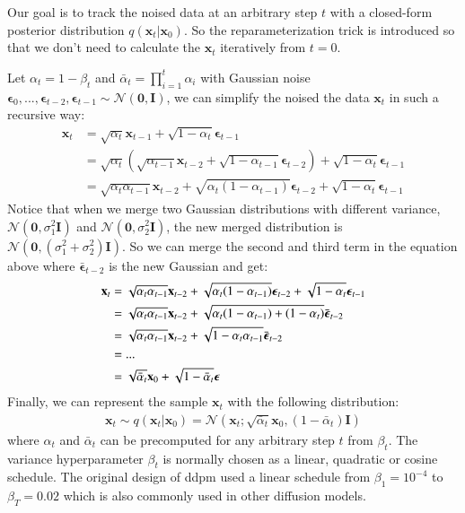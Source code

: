\documentclass[12pt,DIV14,BCOR12mm,a4paper,footinclude=false,headinclude,parskip=half-,twoside,openright,cleardoublepage=empty,toc=index,bibliography=totoc,listof=totoc]{scrreprt}
\numberwithin{equation}{chapter}
\begin{document}
Our goal is to track the noised data at an arbitrary step $t$ with a closed-form posterior distribution $q(\mathbf{x}_{t}|\mathbf{x}_{0})$. So the reparameterization trick is introduced so that we don't need to calculate the $\mathbf{x}_{t}$ iteratively from $t=0$.

Let $\alpha_{t} = 1 - \beta_{t}$ and $\bar{\alpha}_{t} = \prod_{i=1}^{t}\alpha_{i}$ with Gaussian noise $\boldsymbol{\epsilon}_{0},...,\boldsymbol{\epsilon}_{t-2},\boldsymbol{\epsilon}_{t-1} \sim \mathcal{N}(\mathbf{0}, \mathbf{I})$, we can simplify the noised the data $\mathbf{x}_{t}$ in such a recursive way:
\begin{align*}
  \mathbf{x}_{t} &= \sqrt{\alpha_{t}}\mathbf{x}_{t-1} + \sqrt{1-\alpha_{t}}\boldsymbol{\epsilon}_{t-1}\\
                 &= \sqrt{\alpha_{t}}(\sqrt{\alpha_{t-1}}\mathbf{x}_{t-2} + \sqrt{1-\alpha_{t-1}}\boldsymbol{\epsilon}_{t-2}) + \sqrt{1-\alpha_{t}}\boldsymbol{\epsilon}_{t-1}\\
                 &= \sqrt{\alpha_{t}\alpha_{t-1}}\mathbf{x}_{t-2} + \sqrt{\alpha_{t}(1-\alpha_{t-1})}\boldsymbol{\epsilon}_{t-2} + \sqrt{1-\alpha_{t}}\boldsymbol{\epsilon}_{t-1}
\end{align*}
Notice that when we merge two Gaussian distributions with different variance, $\mathcal{N} (\mathbf{0}, \sigma^{2}_{1}\mathbf{I})$ and $\mathcal{N} (\mathbf{0}, \sigma^{2}_{2}\mathbf{I})$, the new merged distribution is $\mathcal{N} (\mathbf{0}, (\sigma^{2}_{1} + \sigma^{2}_{2})\mathbf{I})$. So we can merge the second and third term in the equation above where $\bar{\boldsymbol{\epsilon}}_{t-2}$ is the new Gaussian and get:
\begin{align}\label{eq:xt_x0}
  \mathbf{x}_{t} &= \sqrt{\alpha_{t}\alpha_{t-1}}\mathbf{x}_{t-2} + \sqrt{\alpha_{t}(1-\alpha_{t-1})}\boldsymbol{\epsilon}_{t-2} + \sqrt{1-\alpha_{t}}\boldsymbol{\epsilon}_{t-1}\notag\\
                 &= \sqrt{\alpha_{t}\alpha_{t-1}}\mathbf{x}_{t-2} + \sqrt{\alpha_{t}(1-\alpha_{t-1}) + (1-\alpha_{t})}\bar{\boldsymbol{\epsilon}}_{t-2}\notag\\
                 &= \sqrt{\alpha_{t}\alpha_{t-1}}\mathbf{x}_{t-2} + \sqrt{1-\alpha_{t}\alpha_{t-1}}\bar{\boldsymbol{\epsilon}}_{t-2}\notag\\
                 &=...\notag\\
                 &= \sqrt{\bar{\alpha}_{t}}\mathbf{x}_{0} + \sqrt{1-\bar{\alpha}_{t}}\boldsymbol{\epsilon} 
\end{align}
Finally, we can represent the sample $\mathbf{x}_{t}$ with the following distribution:
\begin{align}
  \mathbf{x}_{t} \sim q(\mathbf{x}_{t}|\mathbf{x}_{0}) = \mathcal{N}(\mathbf{x}_{t}; \sqrt{\bar{\alpha}_{t}}\mathbf{x}_{0}, (1-\bar{\alpha}_{t})\mathbf{I})
\end{align}
where $\alpha_{t}$ and $\bar{\alpha}_{t}$ can be precomputed for any arbitrary step $t$ from $\beta_{t}$. The variance hyperparameter $\beta_{t}$ is normally chosen as a linear, quadratic or cosine schedule. The original design of \gls{ddpm} used a linear schedule from $\beta_{1} = 10^{-4}$ to $\beta_{T} = 0.02$ which is also commonly used in other diffusion models.
\end{document}
